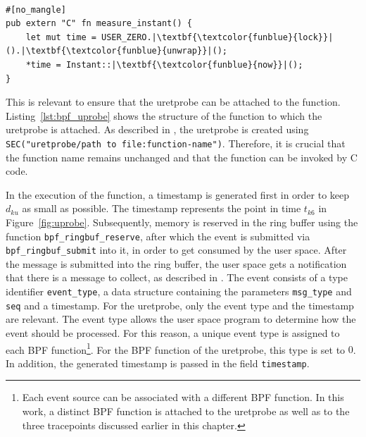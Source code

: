\begin{listing}[H]
    \centering
\begin{verbatim}

#[no_mangle]
pub extern "C" fn measure_instant() {
    let mut time = USER_ZERO.|\textbf{\textcolor{funblue}{lock}}|().|\textbf{\textcolor{funblue}{unwrap}}|();
    *time = Instant::|\textbf{\textcolor{funblue}{now}}|();
}

\end{verbatim}
\caption{Function in Rust to which the uretprobe is attached}
\label{lst:uprobe_rust}
\end{listing}

This is relevant to ensure that the \ac{uretprobe} can be attached to the function.  
Listing~\ref{lst:bpf_uprobe} shows the structure of the function to which the \ac{uretprobe} is attached.  
As described in \cite{uret_probe}, the \ac{uretprobe} is created using \texttt{SEC("uretprobe/path to file:function-name")}.  
Therefore, it is crucial that the function name remains unchanged and that the function can be invoked by C code.  

In the execution of the function, a timestamp is generated first in order to keep $d_{ku}$ as small as possible.  
The timestamp represents the point in time $t_{k6}$ in Figure~\ref{fig:uprobe}.  
Subsequently, memory is reserved in the ring buffer using the function \texttt{bpf\_ringbuf\_reserve}, after which the event is submitted via \texttt{bpf\_ringbuf\_submit} into it, in order to get consumed by the user space.  
After the message is submitted into the ring buffer, the user space gets a notification that there is a message to collect, as described in \cite{buffer_submit}.
The event consists of a type identifier \texttt{event\_type}, a data structure containing the parameters \texttt{msg\_type} and \texttt{seq} and a timestamp.  
For the \ac{uretprobe}, only the event type and the timestamp are relevant.  
The event type allows the user space program to determine how the event should be processed.  
For this reason, a unique event type is assigned to each \ac{BPF} function\footnote{Each event source can be associated with a different \ac{BPF} function.  
In this work, a distinct \ac{BPF} function is attached to the \ac{uretprobe} as well as to the three tracepoints discussed earlier in this chapter.}.  
For the \ac{BPF} function of the \ac{uretprobe}, this type is set to $0$.  
In addition, the generated timestamp is passed in the field \texttt{timestamp}.  

